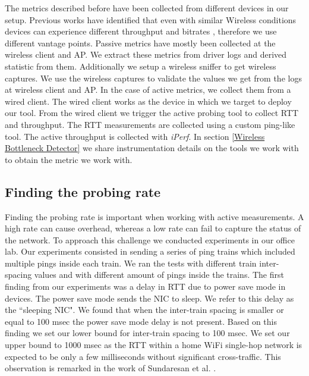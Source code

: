 The metrics described before have been collected from different devices in our setup. Previous works have identified that even with similar Wireless conditions devices can experience different throughput and bitrates \cite{measuring_user_traffic}, therefore we use different vantage points. Passive metrics have mostly been collected at the wireless client and AP. We extract these metrics from driver logs and derived statistic from them. Additionally we setup a wireless sniffer to get wireless captures. We use the wireless captures to validate the values we get from the logs at wireless client and AP. In the case of active metrics, we collect them from a wired client. The wired client works as the device in which we target to deploy our tool. From the wired client we trigger the active probing tool to collect RTT and throughput. The RTT measurements are collected using a custom ping-like tool. The active throughput is collected with \emph{iPerf}. In section \ref{Wireless Bottleneck Detector} we share instrumentation details on the tools we work with to obtain the metric we work with.

\subsection{Finding the probing rate}\label{probing_rate}

Finding the probing rate is important when working with active measurements. A high rate can cause overhead, whereas a low rate can fail to capture the status of the network. To approach this challenge we conducted experiments in our office lab. Our experiments consisted in sending a series of ping trains which included multiple pings inside each train. We ran the tests with different train inter-spacing values and with different amount of pings inside the trains. The first finding from our experiments was a delay in RTT due to power save mode in devices. The power save mode sends the NIC to sleep. We refer to this delay as the ``sleeping NIC". We found that when the inter-train spacing is smaller or equal to 100 msec the power save mode delay is not present. Based on this finding we set our lower bound for inter-train spacing to 100 msec. We set our upper bound to 1000 msec as the RTT within a home WiFi single-hop network is expected to be only a few milliseconds without significant cross-traffic. This observation is remarked in the work of Sundaresan et al. \cite{homeoraccesslink}.

